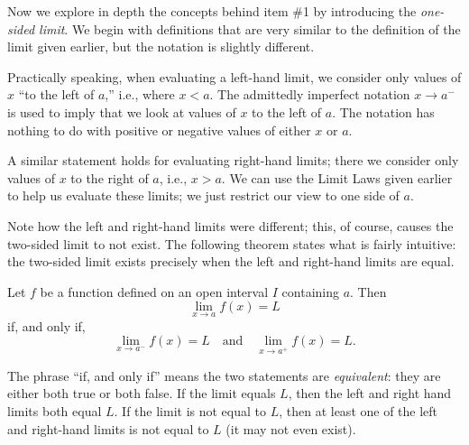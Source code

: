 Now we explore in depth the concepts behind item \#1 by introducing the \textit{one-sided limit}. We begin with  definitions that are very similar to the definition of the limit given earlier, but the notation is slightly different.


Practically speaking, when evaluating a left-hand limit, we consider only values of $x$ ``to the left of $a$,'' i.e., where $x<a$. The admittedly imperfect notation $x \to a^-$ is used to imply that we look at values of $x$ to the left of $a$. The notation has nothing to do with positive or negative values of either $x$ or $a$. 

A similar statement holds for evaluating right-hand limits; there we consider only values of $x$ to the right of $a$, i.e., $x>a$. We can use the Limit Laws given earlier to help us evaluate these limits; we just restrict our view to one side of $a$.


Note how the left and right-hand limits were different; this, of course, causes the two-sided limit to not exist. The following theorem states what is fairly intuitive: the two-sided limit exists precisely when the left and right-hand limits are equal.

{Let $f$ be a function defined on an open interval $I$ containing $a$.  Then 
\[ \lim_{x \to a}f(x) = L\] 
if, and only if, 
\[ \lim_{x \to a^-}f(x) = L \quad \text{and} \quad \lim_{x \to a^+}f(x) = L.\]
} %

The phrase ``if, and only if'' means the two statements are \textit{equivalent}: they are either both true or both false. If the limit equals $L$, then the left and right hand limits both equal $L$. If the limit is not equal to $L$, then at least one of the left and right-hand limits is not equal to $L$ (it may not even exist).

